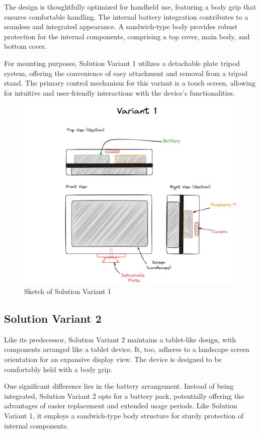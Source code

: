 The design is thoughtfully optimized for handheld use, featuring a body grip that ensures comfortable handling. The internal battery integration contributes to a seamless and integrated appearance. A sandwich-type body provides robust protection for the internal components, comprising a top cover, main body, and bottom cover.

For mounting purposes, Solution Variant 1 utilizes a detachable plate tripod system, offering the convenience of easy attachment and removal from a tripod stand. The primary control mechanism for this variant is a touch screen, allowing for intuitive and user-friendly interactions with the device's functionalities.

\begin{figure}[H]
    \centering
    \includegraphics[width=0.75\linewidth]{texs/Part1/chapter3/image/v1.png}
    \caption{Sketch of Solution Variant 1}
    \label{fig:sketch-solution-variant-1}
\end{figure}


\subsection{Solution Variant 2}
Like its predecessor, Solution Variant 2 maintains a tablet-like design, with components arranged like a tablet device. It, too, adheres to a landscape screen orientation for an expansive display view. The device is designed to be comfortably held with a body grip.

One significant difference lies in the battery arrangement. Instead of being integrated, Solution Variant 2 opts for a battery pack, potentially offering the advantages of easier replacement and extended usage periods. Like Solution Variant 1, it employs a sandwich-type body structure for sturdy protection of internal components.

